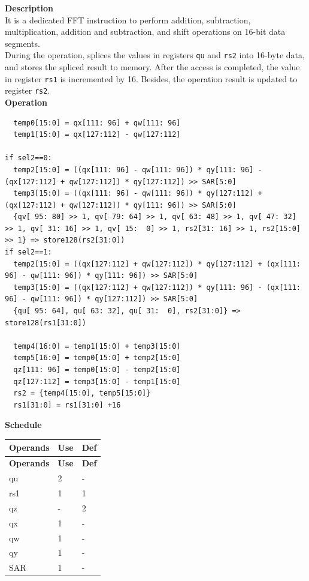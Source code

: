 \textbf{Description}\\
It is a dedicated FFT instruction to perform addition, subtraction, multiplication, addition and subtraction, and shift operations on 16-bit data segments.\\
During the operation, splices the values in registers \lstinline{qu} and \lstinline{rs2} into 16-byte data, and stores the spliced result to memory. After the access is completed, the value in register \lstinline{rs1} is incremented by 16. Besides, the operation result is updated to register \lstinline{rs2}.\\
\textbf{Operation}
\begin{lstlisting}
  temp0[15:0] = qx[111: 96] + qw[111: 96]
  temp1[15:0] = qx[127:112] - qw[127:112]

if sel2==0:
  temp2[15:0] = ((qx[111: 96] - qw[111: 96]) * qy[111: 96] - (qx[127:112] + qw[127:112]) * qy[127:112]) >> SAR[5:0]
  temp3[15:0] = ((qx[111: 96] - qw[111: 96]) * qy[127:112] + (qx[127:112] + qw[127:112]) * qy[111: 96]) >> SAR[5:0]
  {qv[ 95: 80] >> 1, qv[ 79: 64] >> 1, qv[ 63: 48] >> 1, qv[ 47: 32] >> 1, qv[ 31: 16] >> 1, qv[ 15:  0] >> 1, rs2[31: 16] >> 1, rs2[15:0] >> 1} => store128(rs2[31:0])
if sel2==1:
  temp2[15:0] = ((qx[127:112] + qw[127:112]) * qy[127:112] + (qx[111: 96] - qw[111: 96]) * qy[111: 96]) >> SAR[5:0]
  temp3[15:0] = ((qx[127:112] + qw[127:112]) * qy[111: 96] - (qx[111: 96] - qw[111: 96]) * qy[127:112]) >> SAR[5:0]
  {qu[ 95: 64], qu[ 63: 32], qu[ 31:  0], rs2[31:0]} => store128(rs1[31:0])

  temp4[16:0] = temp1[15:0] + temp3[15:0]
  temp5[16:0] = temp0[15:0] + temp2[15:0]
  qz[111: 96] = temp0[15:0] - temp2[15:0]
  qz[127:112] = temp3[15:0] - temp1[15:0]
  rs2 = {temp4[15:0], temp5[15:0]}
  rs1[31:0] = rs1[31:0] +16
\end{lstlisting}

\textbf{Schedule}\\
\begin{longtable}[c]{|l|l|l|}
    \hline
    \rowcolor{lightgray}
    \textbf{Operands} & \textbf{Use} & \textbf{Def} \\\hline
    \endfirsthead
    \hline
    \rowcolor{lightgray}
     \textbf{Operands} & \textbf{Use} & \textbf{Def} \\\hline
    \endhead
    \hline
    \endfoot

  qu & 2 & - \\\hline
  rs1 & 1 & 1 \\\hline
  qz & - & 2 \\\hline
  qx & 1 & - \\\hline
  qw & 1 & - \\\hline
  qy & 1 & - \\\hline
  SAR & 1 & -

\end{longtable}

